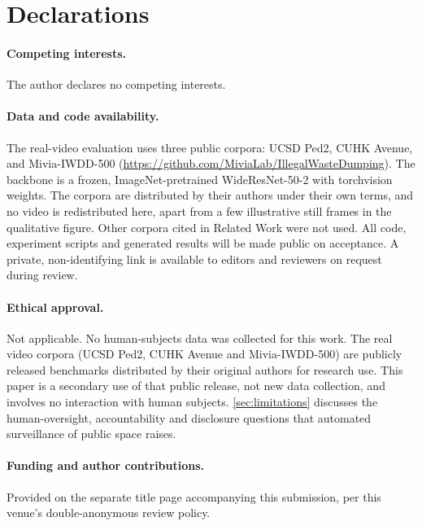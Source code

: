 \documentclass[11pt,a4paper]{article}
\theoremstyle{plain}
\theoremstyle{definition}
\begin{document}







\section*{Declarations}

\paragraph{Competing interests.} The author declares no competing interests.
\paragraph{Data and code availability.} The real-video evaluation uses three public corpora: UCSD Ped2, CUHK Avenue, and Mivia-IWDD-500 (\url{https://github.com/MiviaLab/IllegalWasteDumping}). The backbone is a frozen, ImageNet-pretrained WideResNet-50-2 with torchvision weights. The corpora are distributed by their authors under their own terms, and no video is redistributed here, apart from a few illustrative still frames in the qualitative figure. Other corpora cited in Related Work were not used. All code, experiment scripts and generated results will be made public on acceptance. A private, non-identifying link is available to editors and reviewers on request during review.
\paragraph{Ethical approval.} Not applicable. No human-subjects data was collected for this work. The real video corpora (UCSD Ped2, CUHK Avenue and Mivia-IWDD-500) are publicly released benchmarks distributed by their original authors for research use. This paper is a secondary use of that public release, not new data collection, and involves no interaction with human subjects. \cref{sec:limitations} discusses the human-oversight, accountability and disclosure questions that automated surveillance of public space raises.
\paragraph{Funding and author contributions.} Provided on the separate title page accompanying this submission, per this venue's double-anonymous review policy.


\end{document}
